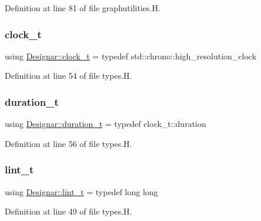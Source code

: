 Definition at line 81 of file graphutilities.\+H.

\mbox{\label{namespace_designar_a4892484bd553fb9ec4b8a559a83a415c}} 
\subsubsection{\texorpdfstring{clock\+\_\+t}{clock\_t}}
{\footnotesize\ttfamily using \hyperlink{namespace_designar_a4892484bd553fb9ec4b8a559a83a415c}{Designar\+::clock\+\_\+t} = typedef std\+::chrono\+::high\+\_\+resolution\+\_\+clock}



Definition at line 54 of file types.\+H.

\mbox{\label{namespace_designar_a585b685c3d4f0d52edf0a6412caee626}} 
\subsubsection{\texorpdfstring{duration\+\_\+t}{duration\_t}}
{\footnotesize\ttfamily using \hyperlink{namespace_designar_a585b685c3d4f0d52edf0a6412caee626}{Designar\+::duration\+\_\+t} = typedef clock\+\_\+t\+::duration}



Definition at line 56 of file types.\+H.

\mbox{\label{namespace_designar_a9d113d66a39e82b73727c72cd3a52f73}} 
\subsubsection{\texorpdfstring{lint\+\_\+t}{lint\_t}}
{\footnotesize\ttfamily using \hyperlink{namespace_designar_a9d113d66a39e82b73727c72cd3a52f73}{Designar\+::lint\+\_\+t} = typedef long long}



Definition at line 49 of file types.\+H.

\mbox{\label{namespace_designar_abc6ea5602461a15100a645d1f0e5cbcb}} 
